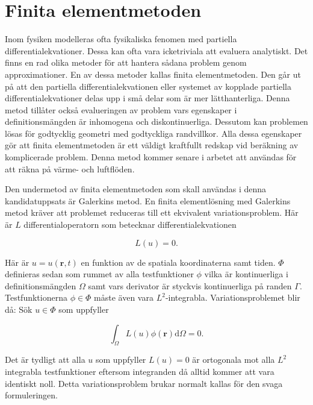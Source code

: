 \section{Finita elementmetoden}
\label{sec:femtheory}

Inom fysiken modelleras ofta fysikaliska fenomen med partiella differentialekvationer.
Dessa kan ofta vara icketriviala att evaluera analytiskt. Det finns en
rad olika metoder för att hantera sådana problem genom approximationer. En av
dessa metoder kallas finita elementmetoden. Den går ut på att den
partiella differentialekvationen eller systemet av kopplade partiella
differentialekvationer delas upp i små delar som är mer lätthanterliga.
Denna metod tillåter också evalueringen av problem vars egenskaper i
definitionsmängden är inhomogena och diskontinuerliga. Dessutom kan
problemen lösas för godtycklig geometri med godtyckliga randvillkor. Alla
dessa egenskaper gör att finita elementmetoden är ett väldigt kraftfullt redskap
vid beräkning av komplicerade problem. Denna metod kommer senare i arbetet
att användas för att räkna på värme- och luftflöden.

Den undermetod av finita element\-metoden som skall användas i denna
kandidat\-uppsats är Galerkins metod.
En finita element\-lösning med Galerkins metod kräver att problemet reduceras till
ett ekvivalent variations\-problem.
Här är $L$ differential\-operatorn
som betecknar differential\-ekvationen

\begin{equation}
\label{eq:femtheoryprob}
L(u) = 0.
\end{equation}

Här är $u = u(\mathbf{r},t)$ en funktion av de spatiala koordinaterna samt tiden.
$\Phi$ definieras sedan som rummet av alla testfunktioner $\phi$ vilka
 är kontinuerliga i
definitionsmängden $\Omega$ samt vars derivator är styckvis kontinuerliga på randen
$\Gamma$. Testfunktionerna $\phi \in \Phi$ måste även vara $L^2$-integrabla.
Variationsproblemet blir då: Sök $u\in\Phi$
som uppfyller 

\begin{equation}
\label{eq:femtheoryweak}
\int_\Omega L(u)\phi(\mathbf{r}) \mathrm{d}\Omega = 0.
\end{equation}

Det är tydligt
att alla $u$ som uppfyller $L(u) = 0$ är ortogonala mot alla
$L^2$ integrabla testfunktioner eftersom integranden då alltid kommer att vara identiskt noll.
Detta variationsproblem brukar normalt kallas för den svaga formuleringen.

